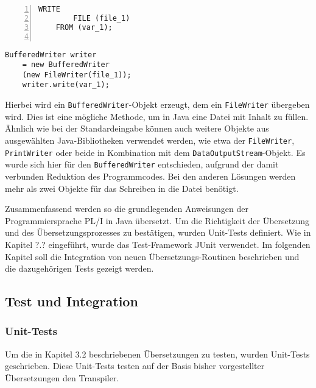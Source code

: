\begin{minipage}[b]{0.48\linewidth}
	\centering
	\lstset{language=PL/I,label=SliceExaple}
	\begin{lstlisting}[frame=single, numbers=left, mathescape,%
		caption={Dateiausgabe}, label={lst:javawriter}]
	WRITE 
		FILE (file_1) 
	FROM (var_1);	
	
	\end{lstlisting}
\end{minipage}
\hspace{0.5cm}
\begin{minipage}[b]{0.48\linewidth}
	\centering
	\lstset{language=Java,label=SliceExaple}
	\begin{lstlisting}[frame=single, mathescape,%
		title={" "}]
	BufferedWriter writer 
	= new BufferedWriter
	(new FileWriter(file_1)); 
	writer.write(var_1);
	\end{lstlisting}
\end{minipage}  

Hierbei wird ein \verb+BufferedWriter+-Objekt erzeugt, dem ein \verb+FileWriter+ übergeben wird. Dies ist eine mögliche Methode, um in Java eine Datei mit Inhalt zu füllen. Ähnlich wie bei der Standardeingabe können auch weitere Objekte aus ausgewählten Java-Bibliotheken verwendet werden, wie etwa der \verb+FileWriter+, \verb+PrintWriter+ oder beide in Kombination mit dem \verb+DataOutputStream+-Objekt. Es wurde sich hier für den \verb+BufferedWriter+ entschieden, aufgrund der damit verbunden Reduktion des Programmcodes. Bei den anderen Lösungen werden mehr als zwei Objekte für das Schreiben in die Datei benötigt.

Zusammenfassend werden so die grundlegenden Anweisungen der Programmiersprache PL/I in Java übersetzt. Um die Richtigkeit der Übersetzung und des Übersetzungsprozesses zu bestätigen, wurden Unit-Tests definiert. Wie in Kapitel ?.? eingeführt, wurde das Test-Framework JUnit verwendet. Im folgenden Kapitel soll die Integration von neuen Übersetzungs-Routinen beschrieben und die dazugehörigen Tests gezeigt werden.

\pagebreak
\subsection{Test und Integration}
\subsubsection{Unit-Tests}

Um die in Kapitel 3.2 beschriebenen Übersetzungen zu testen, wurden Unit-Tests geschrieben. 
Diese Unit-Tests testen auf der Basis bisher vorgestellter Übersetzungen den Transpiler.


